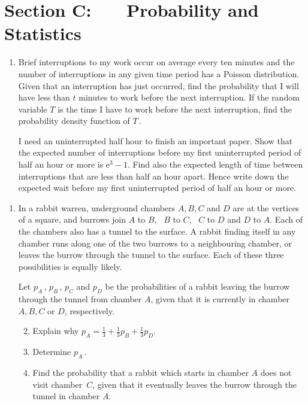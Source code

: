 \documentclass[a4, 11pt]{report}
\newlength{\qspace}
\newcounter{qnumber}
\newenvironment{question}%
 {\vspace{\qspace}
  \begin{enumerate}[\bfseries 1\quad][10]%
    \setcounter{enumi}{\value{qnumber}}%
    \item%
 }
{
  \end{enumerate}
  \filbreak
  \stepcounter{qnumber}
 }
\newenvironment{questionparts}[1][1]%
 {
  \begin{enumerate}[\bfseries (i)]%
    \setcounter{enumii}{#1}
    \addtocounter{enumii}{-1}
    \setlength{\itemsep}{5mm}
    \setlength{\parskip}{8pt}
 }
 {
  \end{enumerate}
 }
\def\e{{\mathrm e}}
\begin{document}
	
	\newpage
\section*{Section C: \ \ \ Probability and Statistics}


\begin{question}
Brief interruptions to my work occur on average every ten minutes 
and the number of interruptions in any given time period has a Poisson distribution. 
Given that an interruption has just occurred, find the probability 
that I will have less than $t$ minutes to work before the next interruption. 
If the random variable $T$ is the time I have to work before the next interruption, 
find the probability density function of $T\,$.   
      
I need an uninterrupted half hour to finish an important paper.  
Show that the expected number of interruptions before my first 
uninterrupted period of half an hour or more is $\e^3-1$. 
Find also the expected length of time between interruptions 
that are less than half an hour apart.
Hence write down 
the expected wait before my first uninterrupted period of half an hour or more.
\end{question}

\begin{question}
In a rabbit warren, underground chambers 
$A, B, C$ and $D$ are at the vertices of a square, 
and burrows join $A$ to $B$, \  $B$ to $C$, \ $C$ to $D$ and $D$ to $A$. 
Each of the chambers also has a tunnel to the surface. 
A rabbit finding itself in any chamber runs along one 
of the two burrows to a neighbouring chamber, or 
leaves the burrow through the tunnel to the surface. 
Each of these three possibilities is equally likely.

Let $p_A\,$, $p_B\,$, $p_C$ and $p_D$ be the probabilities 
of a rabbit leaving the burrow through the tunnel from chamber $A$, 
given that it is currently in chamber $A, B, C$ or $D$, respectively.
\begin{questionparts}
\item Explain why  $p_A = \frac13 + \frac13p_B + \frac13 p_D$.
\item Determine $p_A\,$.
\item Find the probability 
that a rabbit which starts in chamber $A$ does not visit chamber~$C$, 
given that it eventually leaves the burrow through the tunnel in chamber $A$.
\end{questionparts}
\end{question}
\end{document}
